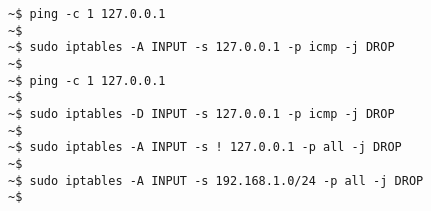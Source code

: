 \documentclass[varwidth=37em]{standalone}
\begin{document}
\begin{verbatim}
~$ ping -c 1 127.0.0.1
~$ 
~$ sudo iptables -A INPUT -s 127.0.0.1 -p icmp -j DROP
~$
~$ ping -c 1 127.0.0.1
~$ 
~$ sudo iptables -D INPUT -s 127.0.0.1 -p icmp -j DROP
~$
~$ sudo iptables -A INPUT -s ! 127.0.0.1 -p all -j DROP
~$
~$ sudo iptables -A INPUT -s 192.168.1.0/24 -p all -j DROP
~$
\end{verbatim}
\end{document}
